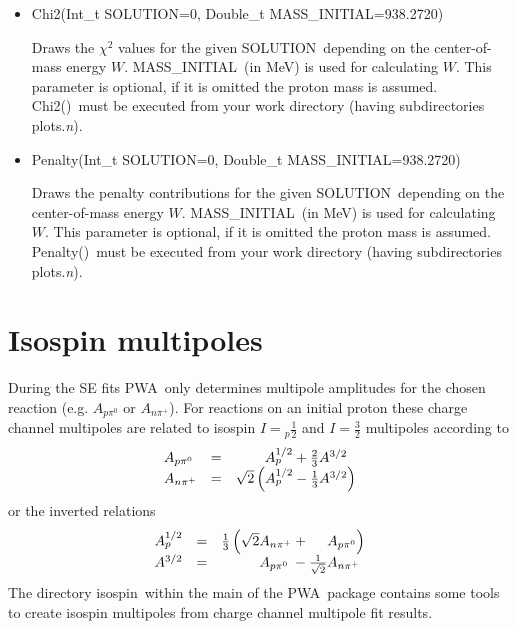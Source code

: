 \documentclass[a4paper,10pt]{article}
\def\PWA{\ttfamily PWA\rmfamily\ }
\def\tt{\ttfamily}
\def\rm{\rmfamily}
\begin{document}
\begin{itemize}
\item
\tt Chi2(Int\_t SOLUTION=0, Double\_t MASS\_INITIAL=938.2720)\rm

Draws the $\chi^2$ values for the given \tt SOLUTION\rm\ depending on the center-of-mass energy $W$.
\tt MASS\_INITIAL\rm\ (in MeV) is used for calculating $W$. This parameter 
is optional, if it is omitted the proton mass is assumed.
\tt Chi2()\rm\ must be executed from your
work directory (having subdirectories \tt plots.\textit{n}\rm).

\item
\tt Penalty(Int\_t SOLUTION=0, Double\_t MASS\_INITIAL=938.2720)\rm

Draws the penalty contributions for the given \tt SOLUTION\rm\ depending on the center-of-mass energy $W$.
\tt MASS\_INITIAL\rm\ (in MeV) is used for calculating $W$. This parameter 
is optional, if it is omitted the proton mass is assumed.
\tt Penalty()\rm\ must be executed from your
work directory (having subdirectories \tt plots.\textit{n}\rm).
\end{itemize}

\section{Isospin multipoles}

During the SE fits \PWA only determines multipole amplitudes for the chosen reaction (e.g. $A_{p \pi^0}$ or $A_{n \pi^+}$).
For reactions on an initial proton these charge channel multipoles are related to isospin
$I = {}_p\frac{1}{2}$ and $I = \frac{3}{2}$ multipoles according to
\begin{displaymath}
\begin{array}{lll}
A_{p \pi^0} &=& \phantom{\sqrt{2}}\hspace{0.75em}A_p^{1/2} + \frac{2}{3} A^{3/2}\\
A_{n \pi^+} &=& \sqrt{2}\left(A_p^{1/2} - \frac{1}{3} A^{3/2}\right)
\end{array}
\end{displaymath}
or the inverted relations
\begin{displaymath}
\begin{array}{lll}
A_p^{1/2} &=& \frac{1}{3}\left(\sqrt{2}A_{n \pi^+} + \phantom{\frac{1}{\sqrt{2}}} A_{p \pi^0}\right)\\
A^{3/2} &=& \phantom{\frac{1}{3}\sqrt{2}}\hspace{0.77em} A_{p \pi^0} \hspace{0.24em}- \frac{1}{\sqrt{2}} A_{n \pi^+}
\end{array}
\end{displaymath}
The directory \tt isospin\rm\ within the main of the \PWA package contains some tools to create isospin multipoles
from charge channel multipole fit results.
\end{document}

